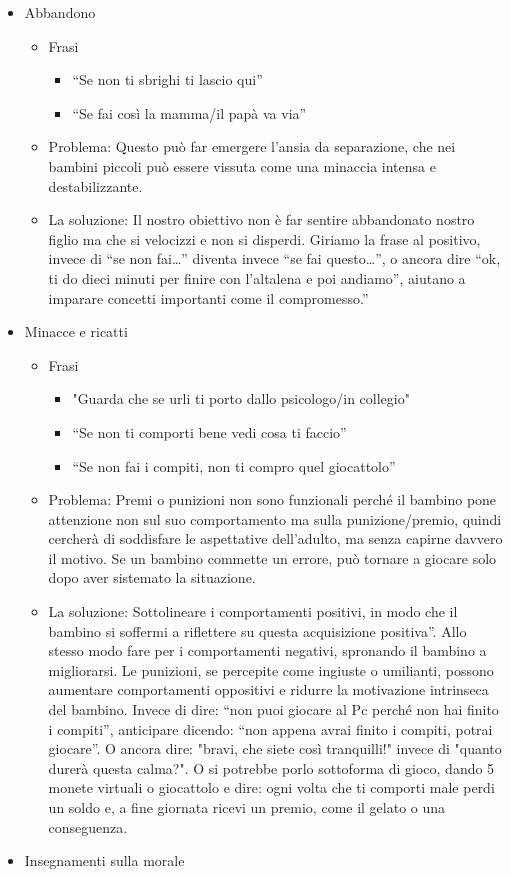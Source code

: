\documentclass[12pt]{book} %
\begin{document}
\begin{itemize}
\item Abbandono

\begin{itemize}
\item Frasi

\begin{itemize}
\item “Se non ti sbrighi ti lascio qui”
\item “Se fai così la mamma/il papà va via”
\end{itemize}
\item Problema: Questo può far emergere l’ansia da separazione, che nei bambini piccoli può essere vissuta come una minaccia intensa e destabilizzante.
\item La soluzione: Il nostro obiettivo non è far sentire abbandonato nostro figlio ma che si velocizzi e non si
disperdi. Giriamo la frase al positivo, invece di “se non fai…” diventa invece “se fai questo…”, o ancora dire “ok, ti
do dieci minuti per finire con l'altalena e poi andiamo”, aiutano a imparare concetti importanti
come il compromesso.”
\end{itemize}
\item Minacce e ricatti

\begin{itemize}
\item Frasi

\begin{itemize}
\item "Guarda che se urli ti porto dallo psicologo/in collegio"
\item “Se non ti comporti bene vedi cosa ti faccio”
\item “Se non fai i compiti, non ti compro quel giocattolo”
\end{itemize}
\item Problema: Premi o punizioni non sono funzionali perché il bambino pone attenzione non sul suo comportamento ma
sulla punizione/premio, quindi cercherà di soddisfare le aspettative dell'adulto, ma senza capirne
davvero il motivo. Se un bambino commette un errore, può tornare a giocare solo dopo aver sistemato la situazione.
\item La soluzione: Sottolineare i comportamenti positivi, in modo che il bambino si soffermi a riflettere su questa
acquisizione positiva”. Allo stesso modo fare per i comportamenti negativi, spronando il bambino a migliorarsi. 
Le punizioni, se percepite come ingiuste o umilianti, possono aumentare comportamenti oppositivi e ridurre la motivazione intrinseca del bambino.
Invece di dire: “non puoi giocare al Pc perché non hai finito i compiti”, anticipare dicendo: 
“non appena avrai finito i compiti, potrai giocare”. O ancora dire: "bravi, che siete così tranquilli!" invece di "quanto durerà questa calma?".
O si potrebbe porlo sottoforma di gioco, dando 5 monete virtuali o giocattolo e dire: ogni volta che ti comporti male perdi un soldo e, a fine giornata ricevi un premio, come il gelato o una conseguenza.
\end{itemize}
\item Insegnamenti sulla morale


\end{itemize}
\end{document}
